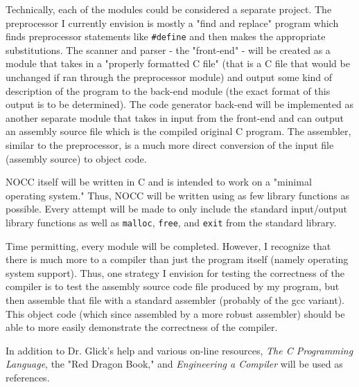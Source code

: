 \documentclass{article}
\begin{document}
Technically, each of the modules could be considered a separate project.
The preprocessor I currently envision is mostly a "find and replace" program which finds preprocessor statements like \texttt{\#define} and then makes the appropriate substitutions.
The scanner and parser - the "front-end" - will be created as a module that takes in a "properly formatted C file" (that is a C file that would be unchanged if ran through the preprocessor module) and output some kind of description of the program to the back-end module (the exact format of this output is to be determined).
The code generator back-end will be implemented as another separate module that takes in input from the front-end and can output an assembly source file which is the compiled original C program.
The assembler, similar to the preprocessor, is a much more direct conversion of the input file (assembly source) to object code.

NOCC itself will be written in C and is intended to work on a "minimal operating system."
Thus, NOCC will be written using as few library functions as possible. 
Every attempt will be made to only include the standard input/output library functions as well as \texttt{malloc}, \texttt{free}, and \texttt{exit} from the standard library.

Time permitting, every module will be completed.
However, I recognize that there is much more to a compiler than just the program itself (namely operating system support).
Thus, one strategy I envision for testing the correctness of the compiler is to test the assembly source code file produced by my program, but then assemble that file with a standard assembler (probably of the gcc variant).
This object code (which since assembled by a more robust assembler) should be able to more easily demonstrate the correctness of the compiler.

In addition to Dr. Glick's help and various on-line resources, \textit{The C Programming Language}\cite{kr}, the "Red Dragon Book\cite{dragon}," and \textit{Engineering a Compiler}\cite{eac} will be used as references.




\end{document}
